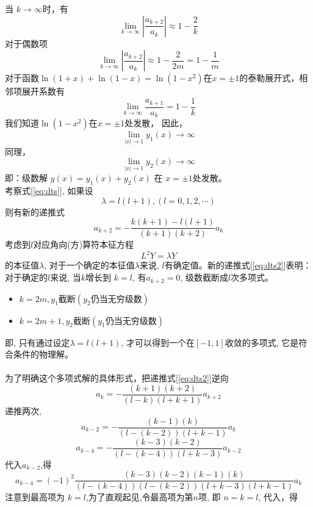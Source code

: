 		当 $k \to \infty$时，有
		\[ \lim_{k \to \infty}|\frac{a_{k+2}}{a_{k}}| \approx 1-\frac{2}{k}\]
		对于偶数项
		\[ \lim_{k \to \infty} |\frac{a_{k+2}}{a_{k}}| \approx 1-\frac{2}{2m} = 1-\frac{1}{m} \]
		对于函数$\ln(1+x)+\ln(1-x) = \ln (1-x^2)$在$x=\pm 1$的泰勒展开式，相邻项展开系数有
		\[ \lim_{k \to \infty} \frac{a_{k+1}}{a_{k}} = 1-\frac{1}{k} \]
		我们知道$\ln (1-x^2)$在$x=\pm 1$处发散， 因此，$$ \lim_{\left \vert x \right \vert \to 1} y_{1}(x) \to \infty $$
		同理，$$ \lim_{\left \vert x \right \vert \to 1} y_{2}(x) \to \infty $$
		即：级数解 $ y(x)=  y_{1}(x) +  y_{2}(x) $ 在 $x=\pm 1$处发散。
		~~\\
		考察式[\ref{eq:dts}], 如果设
		\[\lambda = l(l+1), (l=0,1,2,\cdots )\]
		则有新的递推式
		\begin{equation}\label{eq:dts2}
			a_{k+2}=-\frac{k(k+1)-l(l+1)}{(k+1)(k+2) }a_{k}
		\end{equation}
		考虑到$l$对应角向(方)算符本征方程
		\begin{equation*}
			L^2 Y=\lambda Y
		\end{equation*}	
		的本征值$\lambda$, 对于一个确定的本征值$\lambda$来说, $l$有确定值。新的递推式[\ref{eq:dts2}]表明：对于确定的$l$来说, 当$k$增长到 $k=l$, 有$a_{k+2} =0$, 级数截断成$l$次多项式。
		\begin{itemize}
			\item $k = 2m, y_1 \text{截断}(y_2\text{仍当无穷级数})$
			\item $k = 2m+1, y_2 \text{截断}(y_1\text{仍当无穷级数})$
		\end{itemize}
		即, 只有通过设定$\lambda = l(l+1)$, 才可以得到一个在$[-1, 1]$收敛的多项式, 它是符合条件的物理解。\\
	~~\\
		为了明确这个多项式解的具体形式，把递推式[\ref{eq:dts2}]逆向
		\begin{equation*}
			a_{k}=-\frac{(k+1)(k+2) }{(l-k)(l+k+1)}a_{k+2}
		\end{equation*}
		递推两次,
		\begin{equation*}
			a_{k-2}=-\frac{(k-1)(k)}{(l-(k-2))(l+k-1)}a_{k}
		\end{equation*}	
		\begin{equation*}
			a_{k-4}=-\frac{(k-3)(k-2)}{(l-(k-4))(l+k-3)}a_{k-2}
		\end{equation*}
		代入$a_{k-2}$,得
		\begin{equation*}
			a_{k-4}=(-1)^2\frac{(k-3)(k-2)(k-1)(k)}{(l-(k-4))(l-(k-2))(l+k-3)(l+k-1)}a_{k}
		\end{equation*}		
		注意到最高项为 $k=l$,为了直观起见,令最高项为第$n$项, 即 $n=k=l$, 代入，得
